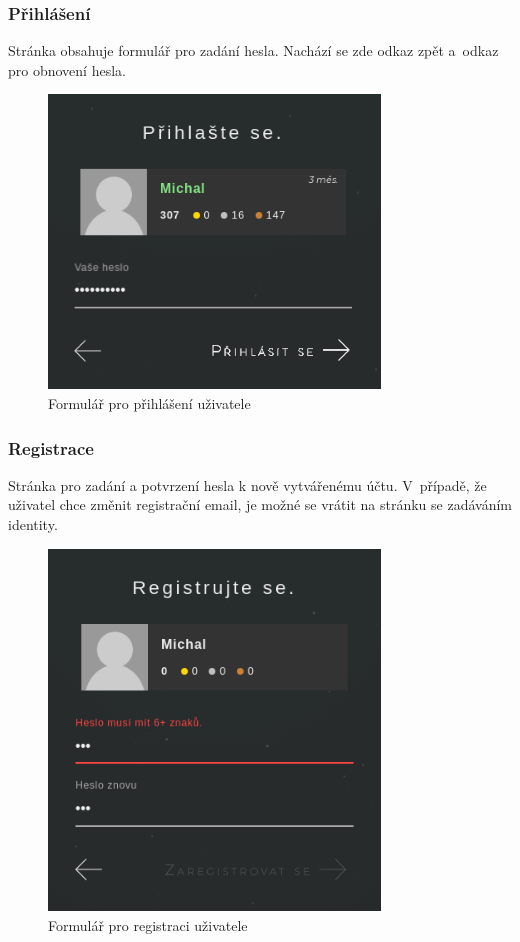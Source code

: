 \documentclass[a4paper,12pt]{article}
\begin{document}
\vspace*{-0.5cm}
\subsubsection{Přihlášení}

Stránka obsahuje formulář pro zadání hesla. Nachází se zde odkaz zpět a~odkaz pro obnovení hesla.

\begin{figure}[H]
\begin{center}
\includegraphics[width=250pt]{Images/SignIn.png}
\caption{Formulář pro přihlášení uživatele}
\label{SignIn}
\end{center}
\end{figure}

\vspace*{-0.5cm}
\subsubsection{Registrace}

Stránka pro zadání a potvrzení hesla k nově vytvářenému účtu. V~případě, že uživatel chce změnit registrační email, je možné se vrátit na stránku se zadáváním identity.

\begin{figure}[H]
\begin{center}
\includegraphics[width=250pt]{Images/SignUp.png}
\caption{Formulář pro registraci uživatele}
\label{SignUp}
\end{center}
\end{figure}
\end{document}
